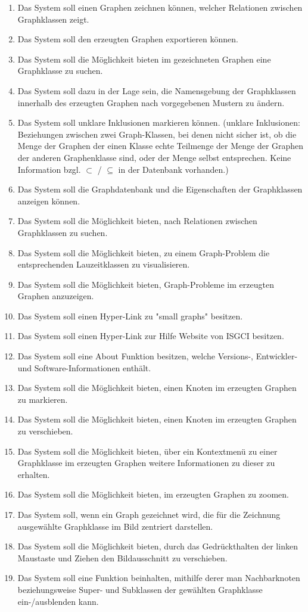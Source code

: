 \documentclass[11pt,a4paper]{article}
\begin{document}
	\begin{enumerate}[leftmargin=.9cm]
\item Das System soll einen Graphen zeichnen können, welcher Relationen zwischen Graphklassen zeigt.
\item Das System soll den erzeugten Graphen exportieren können.
\item Das System soll die Möglichkeit bieten im gezeichneten Graphen eine Graphklasse zu suchen. 
\item Das System soll dazu in der Lage sein, die Namensgebung der Graphklassen innerhalb des erzeugten Graphen nach vorgegebenen Mustern zu ändern.
\item Das System soll unklare Inklusionen markieren können. (unklare Inklusionen: Beziehungen zwischen zwei Graph-Klassen, bei denen nicht sicher ist, ob die Menge der Graphen der einen Klasse echte Teilmenge der Menge der Graphen der anderen Graphenklasse sind, oder der Menge selbst entsprechen. Keine Information bzgl. $\subset$ / $\subseteq$ in der Datenbank vorhanden.)
\item Das System soll die Graphdatenbank und die Eigenschaften der Graphklassen anzeigen können. 
\item Das System soll die Möglichkeit bieten, nach Relationen zwischen Graphklassen zu suchen.
\item Das System soll die Möglichkeit bieten, zu einem Graph-Problem die entsprechenden Lauzeitklassen zu visualisieren.
\item Das System soll die Möglichkeit bieten, Graph-Probleme im erzeugten Graphen anzuzeigen.
\item Das System soll einen Hyper-Link zu "small graphs" besitzen.
\item Das System soll einen Hyper-Link zur Hilfe Website von ISGCI besitzen.
\item Das System soll eine About Funktion besitzen, welche Versions-, Entwickler- und Software-Informationen enthält.
\item Das System soll die Möglichkeit bieten, einen Knoten im erzeugten Graphen zu markieren.
\item Das System soll die Möglichkeit bieten, einen Knoten im erzeugten Graphen zu verschieben.
\item Das System soll die Möglichkeit bieten, über ein Kontextmenü zu einer Graphklasse im erzeugten Graphen weitere Informationen zu dieser zu erhalten.
\item Das System soll die Möglichkeit bieten, im erzeugten Graphen zu zoomen.
\item Das System soll, wenn ein Graph gezeichnet wird, die für die Zeichnung ausgewählte Graphklasse im Bild zentriert darstellen.
\item Das System soll die Möglichkeit bieten, durch das Gedrückthalten der linken Maustaste und Ziehen den Bildausschnitt zu verschieben.
\item Das System soll eine Funktion beinhalten, mithilfe derer man Nachbarknoten beziehungsweise Super- und Subklassen der gewählten Graphklasse ein-/ausblenden kann.


\end{enumerate}
\end{document}
